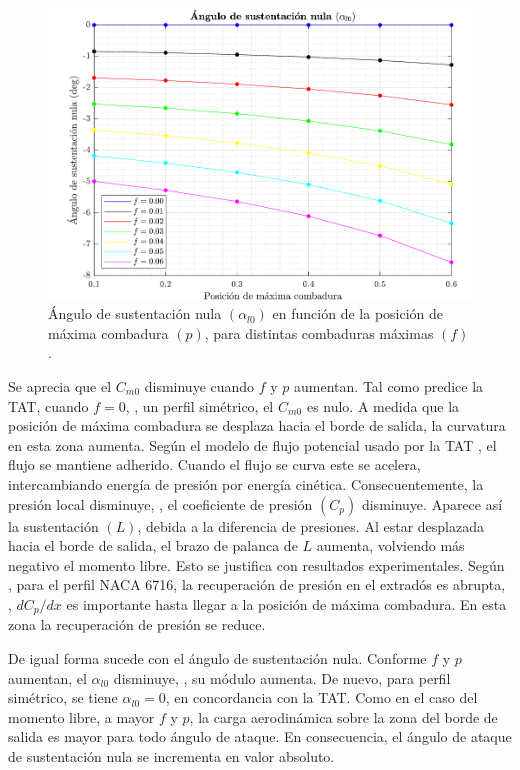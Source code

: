 \begin{figure}[ht] 
    \centering
    \includegraphics[width=\linewidth]{imagenes/discusion/discussion_alpha_l0.pdf}
    \caption{Ángulo de sustentación nula $\left( \alpha_{l0} \right)$ en función de la posición de máxima combadura $\left( p \right)$, para distintas combaduras máximas $\left( f \right)$.}
    \label{fig:discussion_alpha_l0}
\end{figure}

Se aprecia que el $C_{m0}$ disminuye cuando $f$ y $p$ aumentan. Tal como predice la TAT, cuando $f = 0$, \ie, un perfil simétrico, el $C_{m0}$ es nulo. A medida que la posición de máxima combadura se desplaza hacia el borde de salida, la curvatura en esta zona aumenta. Según el modelo de flujo potencial usado por la TAT \cite{ortega}, el flujo se mantiene adherido. Cuando el flujo se curva este se acelera, intercambiando energía de presión por energía cinética. Consecuentemente, la presión local disminuye, \ie, el coeficiente de presión $\left( C_p \right)$ disminuye. Aparece así la sustentación $\left( L \right)$, debida a la diferencia de presiones. Al estar desplazada hacia el borde de salida, el brazo de palanca de $L$ aumenta, volviendo más negativo el momento libre. Esto se justifica con resultados experimentales. Según \cite{nasa_cp}, para el perfil NACA 6716, la recuperación de presión en el extradós es abrupta, \ie, $d C_p / d x$ es importante hasta llegar a la posición de máxima combadura. En esta zona la recuperación de presión se reduce. 

De igual forma sucede con el ángulo de sustentación nula. Conforme $f$ y $p$ aumentan, el $\alpha_{l0}$ disminuye, \ie, su módulo aumenta. De nuevo, para perfil simétrico, se tiene $\alpha_{l0} = 0$, en concordancia con la TAT. Como en el caso del momento libre, a mayor $f$ y $p$, la carga aerodinámica sobre la zona del borde de salida es mayor para todo ángulo de ataque. En consecuencia, el ángulo de ataque de sustentación nula se incrementa en valor absoluto.

